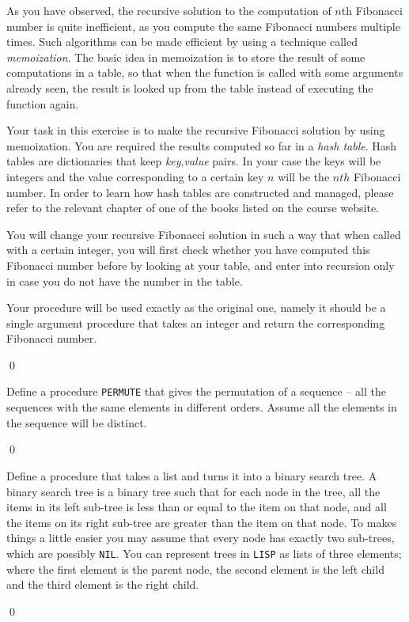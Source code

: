 \documentclass[a4paper,11pt]{article}
\begin{document}
\begin{uexercise}
As you have observed, the recursive solution to the computation of $n$th Fibonacci number is quite inefficient, as you compute the same Fibonacci numbers multiple times. Such algorithms can be made efficient by using a technique called \emph{memoization}. The basic idea in memoization is to store the result of some computations in a table, so that when the function is called with some arguments already seen, the result is looked up from the table instead of executing the function again.

Your task in this exercise is to make the recursive Fibonacci solution by using memoization. You are required the results computed so far in a \emph{hash table}. Hash tables are dictionaries that keep \emph{key},\emph{value} pairs. In your case the keys will be integers and the value corresponding to a certain key $n$ will be the $nth$ Fibonacci number. In order to learn how hash tables are constructed and managed, please refer to the relevant chapter of one of the books listed on the course website.

You will change your recursive Fibonacci solution in such a way that when called with a certain integer, you will first check whether you have computed this Fibonacci number before by looking at your table, and enter into recursion only in case you do not have the number in the table.

Your procedure will be used exactly as the original one, namely it should be a single argument procedure that takes an integer and return the corresponding Fibonacci number. 

\qed
\end{uexercise}

\begin{uexercise}
Define a procedure \Verb+PERMUTE+ that gives the permutation of a sequence -- all the sequences with the same elements in different orders. Assume all the elements in the sequence will be distinct.

\qed
\end{uexercise}

\begin{uexercise}
Define a procedure that takes a list and turns it into a binary search tree. A binary search tree is a binary tree such that for each node in the tree, all the items in its left sub-tree is less than or equal to the item on that node, and all the items on its right sub-tree are greater than the item on that node. To makes things a little easier you may assume that every node has exactly two sub-trees, which are possibly \Verb+NIL+. You can represent trees in \Verb+LISP+ as lists of three elements; where the first element is the parent node, the second element is the left child and the third element is the right child.

\qed
\end{uexercise}
\end{document}
